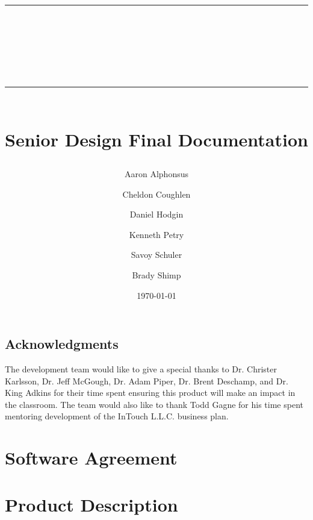 \documentclass{book}
\title{{\color{SDColor3} \rule{\linewidth}{0.5mm}}\\[2mm] {\huge \bfseries \color{SDColor3} \teamName}\\[-1mm] {\color{SDColor3}\rule{\linewidth}{0.5mm}} \\  \vfill
{\LARGE \bfseries \color{SDColor4} Senior Design Final Documentation }\\  \vfill 
{\color{SDColor3} \authors} }
\author
{
	\color{SDColor3} Aaron Alphonsus 
	\and \color{SDColor3} Cheldon Coughlen 
	\and \color{SDColor3} Daniel Hodgin 
	\and \color{SDColor3} Kenneth Petry 
	\and \color{SDColor3} Savoy Schuler
	\and \color{SDColor3} Brady Shimp
}
\date{\color{SDColor3} \today}
\begin{document}
\frontmatter

\maketitle

\vspace*{\fill}

\section*{Acknowledgments}
\label{SpecialThanks}  
The development team would like to give a special thanks to Dr. Christer Karlsson, Dr. Jeff McGough, Dr. Adam Piper, Dr. Brent Deschamp, and Dr. King Adkins for their time spent ensuring this product will make an impact in the classroom.  The team would also like to thank Todd Gagne for his time spent mentoring development of the InTouch L.L.C. business plan. 

\vspace*{\fill}

\tableofcontents
{}
\listoffigures
{}
\listoftables
{}

\mainmatter




\agreement

\chapter{Software Agreement}


\appendix

\chapter{Product Description}






\backmatter
\end{document}
